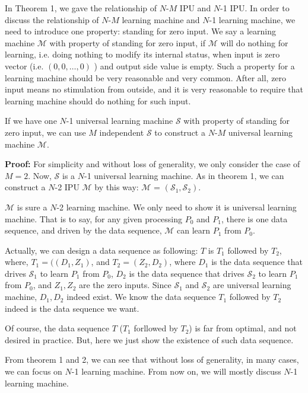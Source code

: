 In Theorem 1, we gave the relationship of $N$-$M$ IPU and $N$-1 IPU. In order to discuss the relationship of  $N$-$M$ learning machine and $N$-1 learning machine, we need to introduce one property: standing for zero input. We say a learning machine $\mathcal{M}$ with property of standing for zero input, if $\mathcal{M}$ will do nothing for learning, i.e. doing nothing to modify its internal status, when input is zero vector (i.e. $(0, 0, \ldots, 0)$ ) and output side value is empty. Such a property for a learning machine should be very reasonable and very common. After all, zero input means no stimulation from outside, and it is very reasonable to require that learning machine should do nothing for such input.



\begin{theorem}
If we have one $N$-1 universal learning machine $\mathcal{S}$ with property of standing for zero input, we can use $M$ independent $\mathcal{S}$ to construct a $N$-$M$ universal learning machine $\mathcal{M}$.
\end{theorem}
{\bf Proof:} For simplicity and without loss of generality, we only consider the case of $M = 2$. Now, $\mathcal{S}$ is a $N$-1 universal learning machine. As in theorem 1, we can construct a $N$-2 IPU $\mathcal{M}$ by this way:  $\mathcal{M}$ = $(\mathcal{S}_1, \mathcal{S}_2)$. 

$\mathcal{M}$ is sure a $N$-2 learning machine. We only need to show it is universal learning machine. That is to say, for any given processing $P_0$ and $P_1$, there is one data sequence, and driven by the data sequence, $\mathcal{M}$ can learn $P_1$ from $P_0$. 

Actually, we can design a data sequence as following: $T$ is $T_1$ followed by $T_2$, where, $T_1  = ( (D_1, Z_1)$, and $T_2 = (Z_2, D_2) $, where $D_1$ is the data sequence that drives $\mathcal{S}_1$ to learn $P_1$ from $P_0$, $D_2$ is the data sequence that drives $\mathcal{S}_2$ to learn $P_1$ from $P_0$, and  $Z_1, Z_2$ are the zero inputs. Since $\mathcal{S}_1$ and $\mathcal{S}_2$ are universal learning machine, $D_1, D_2$ indeed exist. We know the data sequence $T_1$ followed by $T_2$ indeed is the data sequence we want. 

Of course, the data sequence $T$ ($T_1$ forllowed by $T_2$) is far from optimal, and not desired in practice. But, here we just show the existence of such data sequence.
 
From theorem 1 and 2, we can see that without loss of generality, in many cases, we can focus on $N$-1 learning machine. From now on, we will mostly discuss $N$-1 learning machine. 
\bigskip



